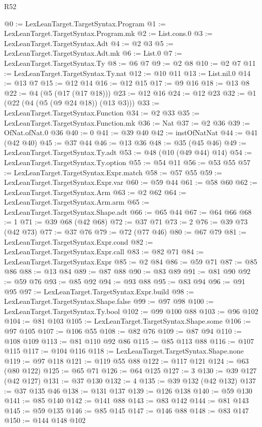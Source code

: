 \begin{lexlean}{R52}
\begin{coremodule}
@0 := LexLeanTarget.TargetSyntax.Program
@1 := LexLeanTarget.TargetSyntax.Program.mk
@2 := List.cons.{0}
@3 := LexLeanTarget.TargetSyntax.Adt
@4 := @2 @3
@5 := LexLeanTarget.TargetSyntax.Adt.mk
@6 := List.{0}
@7 := LexLeanTarget.TargetSyntax.Ty
@8 := @6 @7
@9 := @2 @8
@10 := @2 @7
@11 := LexLeanTarget.TargetSyntax.Ty.nat
@12 := @10 @11
@13 := List.nil.{0}
@14 := @13 @7
@15 := @12 @14
@16 := @12 @15
@17 := @9 @16
@18 := @13 @8
@22 := @4 (@5 (@17 (@17 @18)))
@23 := @12 @16
@24 := @12 @23
@32 := @1 (@22 (@4 (@5 (@9 @24 @18)) (@13 @3)))
@33 := LexLeanTarget.TargetSyntax.Function
@34 := @2 @33
@35 := LexLeanTarget.TargetSyntax.Function.mk
@36 := Nat
@37 := @2 @36
@39 := OfNat.ofNat.{0} @36
@40 := 0
@41 := @39 @40
@42 := instOfNatNat
@44 := @41 (@42 @40)
@45 := @37 @44
@46 := @13 @36
@48 := @35 (@45 @46)
@49 := LexLeanTarget.TargetSyntax.Ty.adt
@53 := @48 (@10 (@49 @44) @14)
@54 := LexLeanTarget.TargetSyntax.Ty.option
@55 := @54 @11
@56 := @53 @55
@57 := LexLeanTarget.TargetSyntax.Expr.match
@58 := @57 @55
@59 := LexLeanTarget.TargetSyntax.Expr.var
@60 := @59 @44
@61 := @58 @60
@62 := LexLeanTarget.TargetSyntax.Arm
@63 := @2 @62
@64 := LexLeanTarget.TargetSyntax.Arm.arm
@65 := LexLeanTarget.TargetSyntax.Shape.adt
@66 := @65 @44
@67 := @64 @66
@68 := 1
@71 := @39 @68 (@42 @68)
@72 := @37 @71
@73 := 2
@76 := @39 @73 (@42 @73)
@77 := @37 @76
@79 := @72 (@77 @46)
@80 := @67 @79
@81 := LexLeanTarget.TargetSyntax.Expr.cond
@82 := LexLeanTarget.TargetSyntax.Expr.call
@83 := @82 @71
@84 := LexLeanTarget.TargetSyntax.Expr
@85 := @2 @84
@86 := @59 @71
@87 := @85 @86
@88 := @13 @84
@89 := @87 @88
@90 := @83 @89
@91 := @81 @90
@92 := @59 @76
@93 := @85 @92
@94 := @93 @88
@95 := @83 @94
@96 := @91 @95
@97 := LexLeanTarget.TargetSyntax.Expr.build
@98 := LexLeanTarget.TargetSyntax.Shape.false
@99 := @97 @98
@100 := LexLeanTarget.TargetSyntax.Ty.bool
@102 := @99 @100 @88
@103 := @96 @102
@104 := @81 @103
@105 := LexLeanTarget.TargetSyntax.Shape.some
@106 := @97 @105
@107 := @106 @55
@108 := @82 @76
@109 := @87 @94
@110 := @108 @109
@113 := @81 @110 @92 @86
@115 := @85 @113 @88
@116 := @107 @115
@117 := @104 @116
@118 := LexLeanTarget.TargetSyntax.Shape.none
@119 := @97 @118
@121 := @119 @55 @88
@122 := @117 @121
@124 := @63 (@80 @122)
@125 := @65 @71
@126 := @64 @125
@127 := 3
@130 := @39 @127 (@42 @127)
@131 := @37 @130
@132 := 4
@135 := @39 @132 (@42 @132)
@137 := @37 @135 @46
@138 := @131 @137
@139 := @126 @138
@140 := @59 @130
@141 := @85 @140
@142 := @141 @88
@143 := @83 @142
@144 := @81 @143
@145 := @59 @135
@146 := @85 @145
@147 := @146 @88
@148 := @83 @147
@150 := @144 @148 @102

\end{coremodule}
\end{lexlean}
